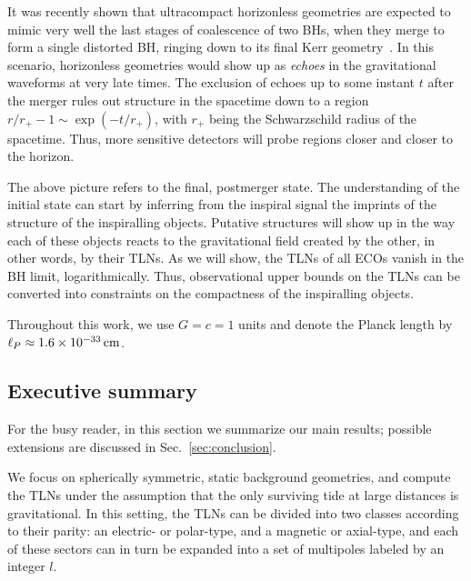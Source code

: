 \documentclass[aps,twocolumn,showpacs,preprintnumbers,nofootinbib,prd,superscriptaddress,groupedaddress,10pt]{revtex4-1}
\begin{document}
It was recently shown that ultracompact horizonless geometries are expected to mimic very well the last stages of coalescence of two BHs, when they merge to form a single distorted BH, ringing down to its final Kerr geometry~\cite{Cardoso:2016oxy,Cardoso:2016rao}. In this scenario, horizonless geometries would show up as {\it echoes} in the gravitational waveforms at very late times. The exclusion of echoes up to some instant $t$ after the merger rules out structure in the spacetime down to a region
$r/r_+-1\sim \exp(-t/r_+)$, with $r_+$ being the Schwarzschild radius of the spacetime. Thus, more sensitive detectors will probe regions closer and closer to the horizon.

The above picture refers to the final, postmerger state. The understanding of the initial state can start by inferring from the inspiral signal the imprints of the structure of the inspiralling objects. Putative structures will show up in the way each of these objects reacts to the gravitational field created by the other, in other words, by their TLNs. As we will show, the TLNs of all ECOs vanish in the BH limit, logarithmically. Thus, observational upper bounds on the TLNs can be converted into constraints on the compactness of the inspiralling objects.

Throughout this work, we use $G=c=1$ units and denote the Planck length by $\ell_P\approx 1.6\times 10^{-33}\,{\rm cm}$.
\subsection{Executive summary}
For the busy reader, in this section we summarize our main results; possible extensions are discussed in Sec.~\ref{sec:conclusion}.

We focus on spherically symmetric, static background geometries, and compute the TLNs under the assumption that the only surviving tide at 
large distances is gravitational. 
%
In this setting, the TLNs can be divided into two classes according to their parity: an electric- or polar-type, and a magnetic or axial-type, and each of these sectors can in turn be expanded into a set of multipoles labeled by an integer $l$.
\end{document}
